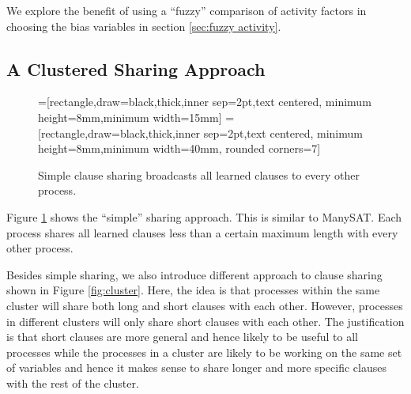 \documentclass[letterpaper, compsoc, conference]{IEEEtran}
\begin{document}
We explore the benefit of using a ``fuzzy'' comparison of activity factors
in choosing the bias variables in section \ref{sec:fuzzy activity}.

\subsection{A Clustered Sharing Approach}

\begin{figure}[htbp]
    =[rectangle,draw=black,thick,inner sep=2pt,text centered,
                     minimum height=8mm,minimum width=15mm]
    =[rectangle,draw=black,thick,inner sep=2pt,text centered,
                        minimum height=8mm,minimum width=40mm, rounded corners=7]
    \begin{center}
    \end{center}
    \caption{Simple clause sharing broadcasts all learned clauses to every other process.}
    \label{fig:simple}
\end{figure}

Figure \ref{fig:simple} shows the ``simple'' sharing approach. This is similar
to ManySAT. Each process shares all learned clauses less than a certain maximum
length with every other process.

Besides simple sharing, we also introduce different approach to clause sharing
shown in Figure \ref{fig:cluster}.  Here, the idea is that processes within the
same cluster will share both long and short clauses with each other.  However,
processes in different clusters will only share short clauses with each other.
The justification is that short clauses are more general and hence likely to be
useful to all processes while the processes in a cluster are likely to be
working on the same set of variables and hence it makes sense to share longer
and more specific clauses with the rest of the cluster.
\end{document}
